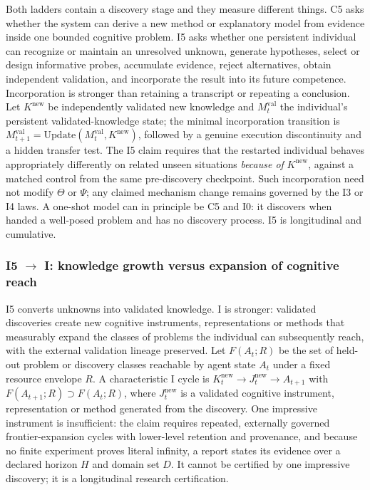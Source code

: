 Both ladders contain a discovery stage and they measure different things. C5 asks whether the system can derive a new method or explanatory model from evidence inside one bounded cognitive problem. I5 asks whether one persistent individual can recognize or maintain an unresolved unknown, generate hypotheses, select or design informative probes, accumulate evidence, reject alternatives, obtain independent validation, and incorporate the result into its future competence. Incorporation is stronger than retaining a transcript or repeating a conclusion. Let $K^{\mathrm{new}}$ be independently validated new knowledge and $M^{\mathrm{val}}_t$ the individual's persistent validated-knowledge state; the minimal incorporation transition is $M^{\mathrm{val}}_{t+1} = \mathrm{Update}(M^{\mathrm{val}}_t, K^{\mathrm{new}})$, followed by a genuine execution discontinuity and a hidden transfer test. The I5 claim requires that the restarted individual behaves appropriately differently on related unseen situations \emph{because of} $K^{\mathrm{new}}$, against a matched control from the same pre-discovery checkpoint. Such incorporation need not modify $\Theta$ or $\Psi$; any claimed mechanism change remains governed by the I3 or I4 laws. A one-shot model can in principle be C5 and I0: it discovers when handed a well-posed problem and has no discovery process. I5 is longitudinal and cumulative.

\subsubsection{I5 $\to$ I\Om{}: knowledge growth versus expansion of cognitive reach}\label{sec:iomega}

I5 converts unknowns into validated knowledge. I\Om{} is stronger: validated discoveries create new cognitive instruments, representations or methods that measurably expand the classes of problems the individual can subsequently reach, with the external validation lineage preserved. Let $F(A_t; R)$ be the set of held-out problem or discovery classes reachable by agent state $A_t$ under a fixed resource envelope $R$. A characteristic I\Om{} cycle is $K^{\mathrm{new}}_t \to J^{\mathrm{new}}_t \to A_{t+1}$ with $F(A_{t+1}; R) \supset F(A_t; R)$, where $J^{\mathrm{new}}_t$ is a validated cognitive instrument, representation or method generated from the discovery. One impressive instrument is insufficient: the claim requires repeated, externally governed frontier-expansion cycles with lower-level retention and provenance, and because no finite experiment proves literal infinity, a report states its evidence over a declared horizon $H$ and domain set $D$. It cannot be certified by one impressive discovery; it is a longitudinal research certification.

